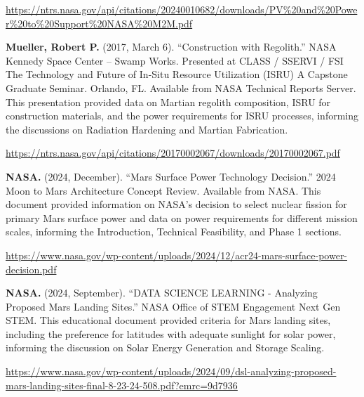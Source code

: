 \documentclass[fontsize=10pt, oneside, DIV=calc]{scrartcl}
\begin{document}
\href{https://ntrs.nasa.gov/api/citations/20240010682/downloads/PV\%20and\%20Power\%20to\%20Support\%20NASA\%20M2M.pdf}{\url{https://ntrs.nasa.gov/api/citations/20240010682/downloads/PV\%20and\%20Power\%20to\%20Support\%20NASA\%20M2M.pdf}}

\vspace{1em}
\noindent \textbf{Mueller, Robert P.} (2017, March 6). ``Construction with Regolith.'' NASA Kennedy Space Center – Swamp Works. Presented at CLASS / SSERVI / FSI The Technology and Future of In-Situ Resource Utilization (ISRU) A Capstone Graduate Seminar. Orlando, FL. Available from NASA Technical Reports Server. This presentation provided data on Martian regolith composition, ISRU for construction materials, and the power requirements for ISRU processes, informing the discussions on Radiation Hardening and Martian Fabrication. 



\href{https://ntrs.nasa.gov/api/citations/20170002067/downloads/20170002067.pdf}{\url{https://ntrs.nasa.gov/api/citations/20170002067/downloads/20170002067.pdf}}

\vspace{1em}
\noindent \textbf{NASA.} (2024, December). ``Mars Surface Power Technology Decision.'' 2024 Moon to Mars Architecture Concept Review. Available from NASA. This document provided information on NASA's decision to select nuclear fission for primary Mars surface power and data on power requirements for different mission scales, informing the Introduction, Technical Feasibility, and Phase 1 sections. 



\href{https://www.nasa.gov/wp-content/uploads/2024/12/acr24-mars-surface-power-decision.pdf}{\url{https://www.nasa.gov/wp-content/uploads/2024/12/acr24-mars-surface-power-decision.pdf}}

\vspace{1em}
\noindent \textbf{NASA.} (2024, September). ``DATA SCIENCE LEARNING - Analyzing Proposed Mars Landing Sites.'' NASA Office of STEM Engagement Next Gen STEM. This educational document provided criteria for Mars landing sites, including the preference for latitudes with adequate sunlight for solar power, informing the discussion on Solar Energy Generation and Storage Scaling. 



\href{https://www.nasa.gov/wp-content/uploads/2024/09/dsl-analyzing-proposed-mars-landing-sites-final-8-23-24-508.pdf?emrc=9d7936}{\url{https://www.nasa.gov/wp-content/uploads/2024/09/dsl-analyzing-proposed-mars-landing-sites-final-8-23-24-508.pdf?emrc=9d7936}}
\end{document}
